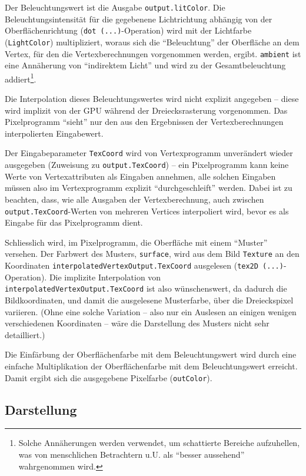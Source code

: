 \documentclass[twoside,a4paper,fleqn,12pt]{book}
\begin{document}
Der Beleuchtungswert ist die Ausgabe \verb+output.litColor+. Die Beleuchtungsintensität für die gegebenene Lichtrichtung abhängig von der Oberflächenrichtung
(\verb+dot (...)+-Operation) wird mit der Lichtfarbe (\verb+LightColor+) multipliziert, woraus sich die "`Beleuchtung"' der Oberfläche an dem
Vertex, für den die Vertexberechnungen vorgenommen werden, ergibt. \verb+ambient+ ist eine Annäherung von "`indirektem Licht"' und wird
zu der Gesamtbeleuchtung addiert\footnote{Solche Annäherungen werden verwendet, um schattierte Bereiche aufzuhellen, was von
menschlichen Betrachtern u.U. als "`besser aussehend"' wahrgenommen wird.}.

Die Interpolation dieses Beleuchtungswertes wird nicht explizit angegeben -- diese wird implizit von der GPU während der Dreiecksrasterung
vorgenommen. Das Pixelprogramm "`sieht"' nur den aus den Ergebnissen der Vertexberechnungen interpolierten Eingabewert.

Der Eingabeparameter \verb+TexCoord+ wird von Vertexprogramm unverändert wieder ausgegeben (Zuweisung zu \verb+output.TexCoord+) --
ein Pixelprogramm kann keine Werte von Vertexattributen als Eingaben annehmen, alle solchen Eingaben müssen also im Vertexprogramm
explizit "`durchgeschleift"' werden. Dabei ist zu beachten, dass, wie alle Ausgaben der Vertexberechnung, auch zwischen \verb+output.TexCoord+-Werten
von mehreren Vertices interpoliert wird, bevor es als Eingabe für das Pixelprogramm dient.

Schliesslich wird, im Pixelprogramm, die Oberfläche mit einem "`Muster"' versehen. Der Farbwert des Musters, \verb+surface+, wird aus dem Bild \verb+Texture+
an den Koordinaten \verb+interpolatedVertexOutput.TexCoord+ ausgelesen (\verb+tex2D (...)+-Operation).
Die implizite Interpolation von \verb+interpolatedVertexOutput.TexCoord+ ist also wünschenswert, da dadurch die Bildkoordinaten,
und damit die ausgelesene Musterfarbe, über die Dreieckspixel variieren. (Ohne eine solche Variation -- also nur ein Auslesen an einigen wenigen verschiedenen Koordinaten --
wäre die Darstellung des Musters nicht sehr detailliert.)

Die Einfärbung der Oberflächenfarbe mit dem Beleuchtungswert wird durch eine einfache Multiplikation der Oberflächenfarbe mit
dem Beleuchtungswert erreicht. Damit ergibt sich die ausgegebene Pixelfarbe (\verb+outColor+).

\subsection{Darstellung}
\end{document}
